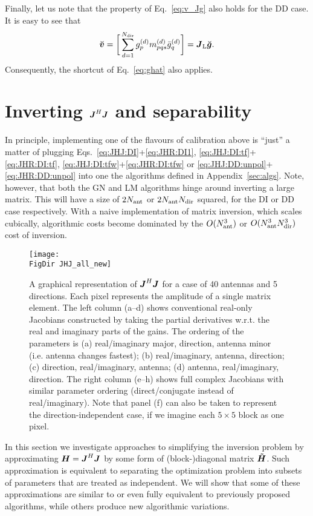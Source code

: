 \documentclass[useAMS,usenatbib]{mn2e}
\newcommand{\mat}[1]{{\bmath{#1}}}
\newcommand{\JJ}{\mat{J}} %
\newcommand{\HH}{\mat{H}} %
\newcommand{\HHa}{\mat{\tilde{H}}} %
\newcommand{\JHJ}{\JJ^H\JJ} %
\newcommand{\AUG}[1]{\bmath{\breve{#1}}}
\newcommand{\Gg}{\AUG{g}}
\newcommand{\Vv}{\AUG{v}}
\newcommand{\LEFT}{\mathrm{L}}
\newcommand{\FigDir}{./}
\numberwithin{equation}{section}
\begin{document}
Finally, let us note that the property of Eq.~\ref{eq:v_Jg} also holds for the DD case. It is easy to see that
\begin{equation}
\label{eq:v_Jg:dd}
\Vv = \bigg [ \sum_{d=1}^{\Nd} \ggd_p \mmd_{pqs} \ggdH_q \bigg ] = \JJ_\LEFT \Gg.
\end{equation}
Consequently, the shortcut of Eq.~\ref{eq:ghat} also applies.

\section{Inverting $\JJ^H\JJ$ and separability}
\label{sec:separability}

In principle, implementing one of the flavours of calibration above is ``just'' a matter of  
plugging Eqs.~\ref{eq:JHJ:DI}+\ref{eq:JHR:DI1}, \ref{eq:JHJ:DI:tf}+\ref{eq:JHR:DI:tf},
\ref{eq:JHJ:DI:tfw}+\ref{eq:JHR:DI:tfw} or \ref{eq:JHJ:DD:unpol}+\ref{eq:JHR:DD:unpol} into one the 
algorithms defined in 
Appendix~\ref{sec:algs}. Note, however, that both the GN and LM algorithms hinge around 
inverting a large matrix. This will have a size of $2N_\mathrm{ant}$ or $2N_\mathrm{ant}N_\mathrm{dir}$ squared, 
for the DI or DD case respectively. With a naive implementation of matrix inversion, 
which scales cubically, algorithmic costs become dominated by the $O(N_\mathrm{ant}^3)$ or $O(N_\mathrm{ant}^3N_\mathrm{dir}^3)$
cost of inversion.


\begin{figure*}
\begin{center}
\texttt{[image: \\FigDir JHJ\_all\_new]}
\caption{\label{fig:JHJ}A graphical representation of $\JHJ$ for a case of 
40 antennas and 5 directions. Each pixel represents the amplitude of a single matrix element.
The left column (a--d) shows conventional real-only Jacobians constructed by taking the partial derivatives w.r.t. 
the real and imaginary parts of the gains. The ordering of the parameters is (a) real/imaginary major, 
direction, antenna minor (i.e. antenna changes fastest); (b) real/imaginary, antenna, direction; (c) direction, 
real/imaginary, antenna; (d) antenna, real/imaginary, direction. The right column (e--h) shows full complex Jacobians with similar parameter ordering (direct/conjugate instead of real/imaginary). Note that panel (f) can also be taken to represent the direction-independent case, if we imagine each $5\times5$ block as one pixel.}
\end{center}
\end{figure*}

In this section we investigate approaches to simplifying the inversion problem by approximating
$\HH=\JJ^H\JJ$ by some form of (block-)diagonal matrix $\HHa$. Such approximation is equivalent to separating
the optimization problem into subsets of parameters that are treated as independent. We will show 
that some of these approximations are similar to or even fully equivalent to previously proposed 
algorithms, while others produce new algorithmic variations.
\end{document}
